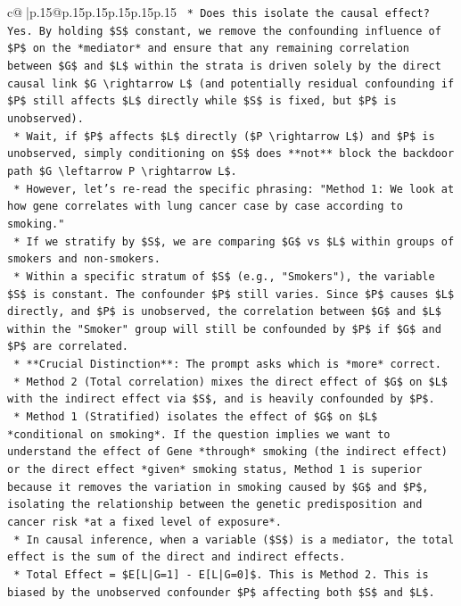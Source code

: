 \documentclass{article}
\begin{document}
{\begin{supertabular}{c@{$\;$}|p{.15\linewidth}@{}p{.15\linewidth}p{.15\linewidth}p{.15\linewidth}p{.15\linewidth}p{.15\linewidth}}
{{{\texttt{    *   Does this isolate the causal effect? Yes. By holding \$S\$ constant, we remove the confounding influence of \$P\$ on the *mediator* and ensure that any remaining correlation between \$G\$ and \$L\$ within the strata is driven solely by the direct causal link \$G \textbackslash{}rightarrow L\$ (and potentially residual confounding if \$P\$ still affects \$L\$ directly while \$S\$ is fixed, but \$P\$ is unobserved).} \\
\texttt{    *   Wait, if \$P\$ affects \$L\$ directly (\$P \textbackslash{}rightarrow L\$) and \$P\$ is unobserved, simply conditioning on \$S\$ does **not** block the backdoor path \$G \textbackslash{}leftarrow P \textbackslash{}rightarrow L\$.} \\
\texttt{    *   However, let's re{-}read the specific phrasing: "Method 1: We look at how gene correlates with lung cancer case by case according to smoking."} \\
\texttt{    *   If we stratify by \$S\$, we are comparing \$G\$ vs \$L\$ within groups of smokers and non{-}smokers.} \\
\texttt{    *   Within a specific stratum of \$S\$ (e.g., "Smokers"), the variable \$S\$ is constant. The confounder \$P\$ still varies. Since \$P\$ causes \$L\$ directly, and \$P\$ is unobserved, the correlation between \$G\$ and \$L\$ within the "Smoker" group will still be confounded by \$P\$ if \$G\$ and \$P\$ are correlated.} \\
\texttt{    *   **Crucial Distinction**: The prompt asks which is *more* correct.} \\
\texttt{        *   Method 2 (Total correlation) mixes the direct effect of \$G\$ on \$L\$ with the indirect effect via \$S\$, and is heavily confounded by \$P\$.} \\
\texttt{        *   Method 1 (Stratified) isolates the effect of \$G\$ on \$L\$ *conditional on smoking*. If the question implies we want to understand the effect of Gene *through* smoking (the indirect effect) or the direct effect *given* smoking status, Method 1 is superior because it removes the variation in smoking caused by \$G\$ and \$P\$, isolating the relationship between the genetic predisposition and cancer risk *at a fixed level of exposure*.} \\
\texttt{    *   In causal inference, when a variable (\$S\$) is a mediator, the total effect is the sum of the direct and indirect effects.} \\
\texttt{        *   Total Effect = \$E{[}L|G=1{]} {-} E{[}L|G=0{]}\$. This is Method 2. This is biased by the unobserved confounder \$P\$ affecting both \$S\$ and \$L\$.} \\
}}}
\end{supertabular}}
\end{document}
